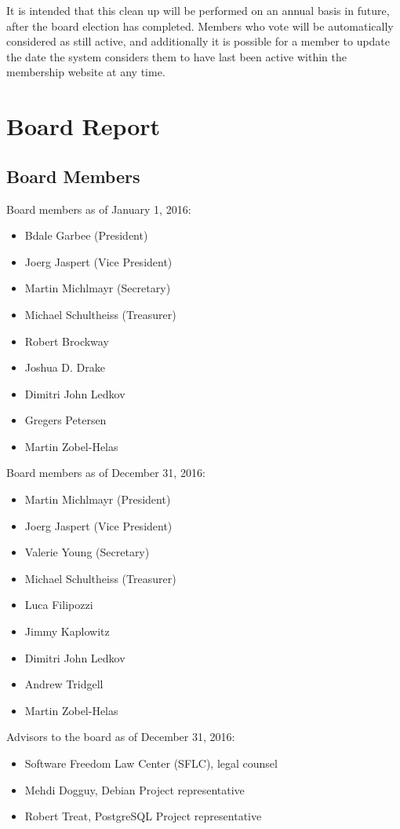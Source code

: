 \documentclass[letterpaper]{report}
\begin{document}
It is intended that this clean up will be performed on an annual basis in future, after the board election has completed. Members who vote will be automatically considered as still active, and additionally it is possible for a member to update the date the system considers them to have last been active within the membership website at any time.

\chapter{Board Report}
\section{Board Members}

Board members as of January 1, 2016:

\begin{itemize}
\item Bdale Garbee (President)
\item Joerg Jaspert (Vice President)
\item Martin Michlmayr (Secretary)
\item Michael Schultheiss (Treasurer)
\item Robert Brockway
\item Joshua D. Drake
\item Dimitri John Ledkov
\item Gregers Petersen
\item Martin Zobel-Helas
\end{itemize}

Board members as of December 31, 2016:

\begin{itemize}
\item Martin Michlmayr (President)
\item Joerg Jaspert (Vice President)
\item Valerie Young (Secretary)
\item Michael Schultheiss (Treasurer)
\item Luca Filipozzi
\item Jimmy Kaplowitz
\item Dimitri John Ledkov
\item Andrew Tridgell
\item Martin Zobel-Helas
\end{itemize}

Advisors to the board as of December 31, 2016:

\begin{itemize}
\item Software Freedom Law Center (SFLC), legal counsel
\item Mehdi Dogguy, Debian Project representative
\item Robert Treat, PostgreSQL Project representative
\end{itemize}
\end{document}
